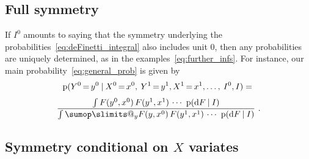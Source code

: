\documentclass[\ifafour a4paper,12pt,\else a5paper,10pt,\fi%
onecolumn,oneside,article,%
british%
]{memoir}
\makeatletter
\theoremstyle{remark}
\theoremstyle{innote}
\def\sum{\DOTSI\sumop\slimits@}
\newcommand*{\di}{\mathrm{d}}%
\newcommand*{\p}{\mathrm{p}}%
\renewcommand*{\|}[1][]{\nonscript\:#1\vert\nonscript\:\mathopen{}}
\newcommand*{\mo}[1][=]{\mathord{\,#1\,}}
\newcommand*{\Iyx}{I}
\makeatother
\begin{document}
\subsection{Full symmetry}
\label{sec:unit0_full}

If $\Iyx^{0}$ amounts to saying that the symmetry underlying the probabilities~\eqref{eq:deFinetti_integral} also includes unit $0$, then any probabilities are uniquely determined, as in the examples~\eqref{eq:further_infs}. For instance, our main probability~\eqref{eq:general_prob} is given by
\begin{multline}
  \label{eq:general_prob_fullexch}
  \p(Y^{0}\mo y^{0} \|
  X^{0}\mo x^{0},\: Y^{1}\mo y^{1},X^{1}\mo x^{1},\dotsc,\: \Iyx^{0},I)
  =
{}\\[\jot]
  \frac{
    \int F(y^{0},x^{0})\, F(y^{1},x^{1})\,\dotsm\  \p(\di F \|I)
  }{
    \int \sum_{y}F(y,x^{0})\, F(y^{1},x^{1})\,\dotsm\  \p(\di F \|I)
  } \ .
\end{multline}

\subsection{Symmetry conditional on $X$ variates}
\label{sec:unit0_condX}
\end{document}
